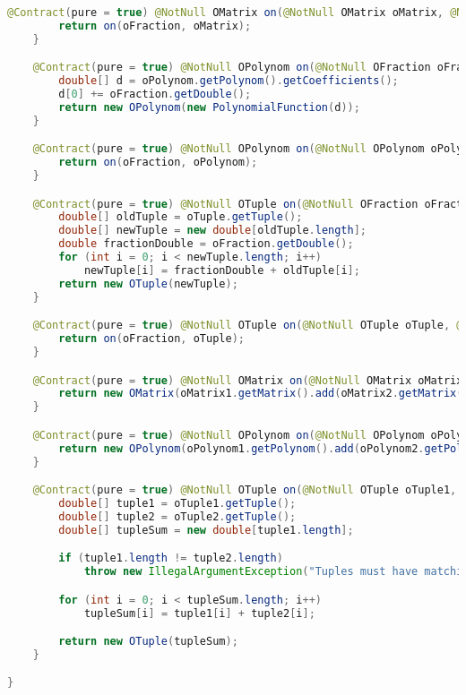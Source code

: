 \begin{lstlisting}[caption=Plus (Schwenke),label=list:Plus,language=Java]
    @Contract(pure = true) @NotNull OMatrix on(@NotNull OMatrix oMatrix, @NotNull OFraction oFraction) {
        return on(oFraction, oMatrix);
    }

    @Contract(pure = true) @NotNull OPolynom on(@NotNull OFraction oFraction, @NotNull OPolynom oPolynom) {
        double[] d = oPolynom.getPolynom().getCoefficients();
        d[0] += oFraction.getDouble();
        return new OPolynom(new PolynomialFunction(d));
    }

    @Contract(pure = true) @NotNull OPolynom on(@NotNull OPolynom oPolynom, @NotNull OFraction oFraction) {
        return on(oFraction, oPolynom);
    }

    @Contract(pure = true) @NotNull OTuple on(@NotNull OFraction oFraction, @NotNull OTuple oTuple) {
        double[] oldTuple = oTuple.getTuple();
        double[] newTuple = new double[oldTuple.length];
        double fractionDouble = oFraction.getDouble();
        for (int i = 0; i < newTuple.length; i++)
            newTuple[i] = fractionDouble + oldTuple[i];
        return new OTuple(newTuple);
    }

    @Contract(pure = true) @NotNull OTuple on(@NotNull OTuple oTuple, @NotNull OFraction oFraction) {
        return on(oFraction, oTuple);
    }

    @Contract(pure = true) @NotNull OMatrix on(@NotNull OMatrix oMatrix1, @NotNull OMatrix oMatrix2) {
        return new OMatrix(oMatrix1.getMatrix().add(oMatrix2.getMatrix()));
    }

    @Contract(pure = true) @NotNull OPolynom on(@NotNull OPolynom oPolynom1, @NotNull OPolynom oPolynom2) {
        return new OPolynom(oPolynom1.getPolynom().add(oPolynom2.getPolynom()));
    }

    @Contract(pure = true) @NotNull OTuple on(@NotNull OTuple oTuple1, @NotNull OTuple oTuple2) {
        double[] tuple1 = oTuple1.getTuple();
        double[] tuple2 = oTuple2.getTuple();
        double[] tupleSum = new double[tuple1.length];

        if (tuple1.length != tuple2.length)
            throw new IllegalArgumentException("Tuples must have matching size.");

        for (int i = 0; i < tupleSum.length; i++)
            tupleSum[i] = tuple1[i] + tuple2[i];

        return new OTuple(tupleSum);
    }

}
\end{lstlisting}    

